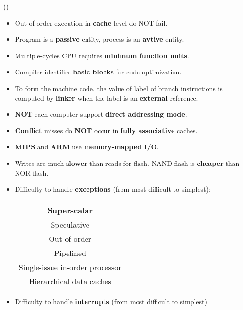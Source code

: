 \item \begin{theorem}{()} \quad\quad \begin{itemize}
        \item Out-of-order execution in \textbf{cache} level do NOT fail.
        \item Program is a \textbf{passive} entity, process is an \textbf{avtive} entity.
        \item Multiple-cycles CPU requires \textbf{minimum function units}.
        \item Compiler identifies \textbf{basic blocks} for code optimization.
        \item To form the machine code, the value of label of branch instructions is computed by \textbf{linker} when the label is an \textbf{external} reference.
        \item \textbf{NOT} each computer support \textbf{direct addressing mode}.
        \item \textbf{Conflict} misses do \textbf{NOT} occur in \textbf{fully associative} caches.
        \item \textbf{MIPS} and \textbf{ARM} use \textbf{memory-mapped I/O}.
        \item Writes are much \textbf{slower} than reads for flash. NAND flash is \textbf{cheaper} than NOR flash.
        \item Difficulty to handle \textbf{exceptions} (from most difficult to simplest): \begin{table}[H]
            \centering
            \begin{tabular}{|c|}
                \hline
                Superscalar \\
                \hline
                Speculative \\
                \hline
                Out-of-order \\
                \hline
                Pipelined \\
                \hline
                Single-issue in-order processor \\
                \hline
                Hierarchical data caches \\
                \hline
            \end{tabular}
        \end{table}
        \item Difficulty to handle \textbf{interrupts} (from most difficult to simplest): \begin{table}[H]

\end{table}
\end{itemize}
\end{theorem}
